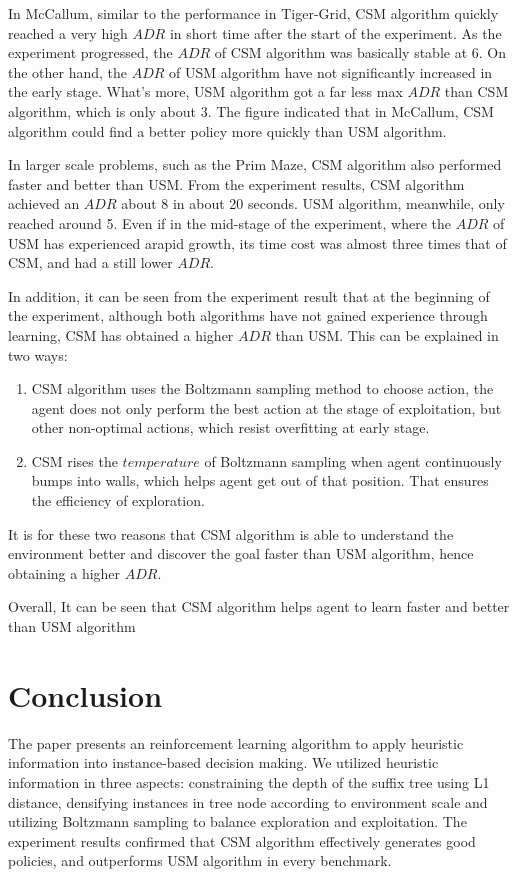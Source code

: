 \documentclass[conference]{IEEEtran}
\begin{document}
	In McCallum, similar to the performance in Tiger-Grid, CSM algorithm quickly reached
	a very high $ADR$ in short time after the start of the experiment. As the experiment
	progressed, the $ADR$ of CSM algorithm was basically stable at 6. On the other hand,
	the $ADR$ of USM algorithm have not significantly increased in the early stage. What's more,
	USM algorithm got a far less max $ADR$ than CSM algorithm, which is only about 3. The figure
	indicated that in McCallum, CSM algorithm could find a better policy more quickly than USM
	algorithm.
	
	In larger scale problems, such as the Prim Maze, CSM algorithm also performed
	faster and better than USM. From the experiment results, CSM algorithm achieved an
	$ADR$ about 8 in about 20 seconds. USM algorithm, meanwhile, only reached around 5.
	Even if in the mid-stage of the experiment, where the $ADR$ of USM has experienced arapid growth,
	its time cost was almost three times that of CSM, and had a still lower $ADR$.
	
	In addition, it can be seen from the experiment result that at the beginning of the experiment,
	although both algorithms have not gained experience through learning, CSM has obtained a higher
	$ADR$ than USM. This can be explained in two ways:
	\begin{enumerate}
		\item CSM algorithm uses the Boltzmann sampling method to choose action, the agent does
		not only perform the best action at the stage of exploitation, but  other non-optimal actions,
		which resist overfitting at early stage.
		
		\item CSM rises the $temperature$ of Boltzmann sampling when agent continuously bumps into walls,
		which helps agent get out of that position. That ensures the efficiency of exploration.
		
	\end{enumerate}
	It is for these two reasons that CSM algorithm is able to understand the environment better and
	discover the goal faster than USM algorithm, hence obtaining a higher $ADR$.
	
	Overall, It can be seen that CSM algorithm helps agent to learn faster and better than USM algorithm
	
	
	\section{Conclusion}
	
	The paper presents an reinforcement learning algorithm to apply heuristic information
	into instance-based decision making. We utilized heuristic information in three aspects: constraining the depth
	of the suffix tree using L1 distance, densifying instances in tree node according to environment scale 
	and utilizing Boltzmann sampling to balance exploration and exploitation. The experiment results
	confirmed that CSM algorithm effectively generates good policies, and outperforms USM algorithm in
	every benchmark.
	
\end{document}
